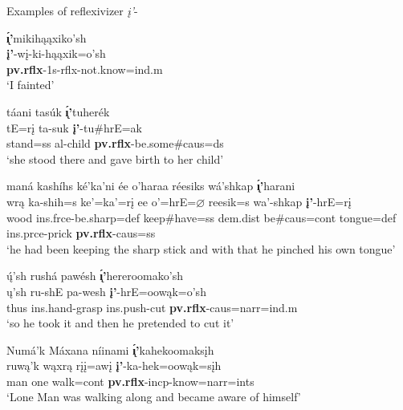 \begin{exe}

\item\label{reflexivizerexamples} Examples of reflexivizer \textit{į'}-

	\begin{xlist}
	
		
	\item \glll \textbf{\'{ı̨}'}mikihąąxiko'sh\\
	\textbf{į'}-wį-ki-hąąxik=o'sh\\
	\textbf{pv.rflx}-1s-rflx-\textnormal{not.know}=ind.m\\
	\glt `I fainted' \citep[170]{trechter2012b}
	
		\item \glll táani tasúk \textbf{\'{ı̨}'}tuherék\\
	tE=rį ta-suk \textbf{į'}-tu\#hrE=ak\\
	\textnormal{stand}=ss al-\textnormal{child} \textbf{pv.rflx}-\textnormal{be.some}\#caus=ds\\
	\glt `she stood there and gave birth to her child' \citep[111]{hollow1973a}
	
	\item \glll maná kashíhs ké'ka'ni ée o'haraa réesiks wá'shkap \textbf{\'{ı̨}'}harani\\
	wrą ka-shih=s ke'=ka'=rį ee o'=hrE=$\varnothing$ reesik=s wa'-shkap \textbf{į'}-hrE=rį\\
	\textnormal{wood} ins.frce-\textnormal{be.sharp}=def \textnormal{keep}\#\textnormal{have}=ss dem.dist \textnormal{be}\#caus=cont \textnormal{tongue}=def ins.prce-\textnormal{prick} \textbf{pv.rflx}-caus=ss\\
	\glt `he had been keeping the sharp stick and with that he pinched his own tongue' \citep[191]{hollow1973a}
	
	\item \glll ų́'sh rushá pawésh \textbf{\'{ı̨}'}hereroomako'sh\\
	ų'sh ru-shE pa-wesh \textbf{į'}-hrE=oowąk=o'sh\\
	\textnormal{thus} ins.hand-\textnormal{grasp} ins.push-\textnormal{cut} \textbf{pv.rflx}-caus=narr=ind.m\\
	\glt `so he took it and then he pretended to cut it' \citep[191]{hollow1973a}
	
	\item \glll Numá'k Máxana níinami \textbf{\'{ı̨}'}kahekoomaksįh\\
	ruwą'k wąxrą rįį=awį \textbf{į'}-ka-hek=oowąk=sįh\\
	\textnormal{man} \textnormal{one} \textnormal{walk}=cont \textbf{pv.rflx}-incp-\textnormal{know}=narr=ints\\
	\glt `Lone Man was walking along and became aware of himself' \citep[5]{hollow1973a}
	

\end{xlist}
\end{exe}
